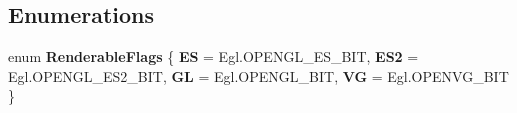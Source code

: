\subsection*{Enumerations}
\begin{DoxyCompactItemize}
\item 
enum {\bfseries Renderable\-Flags} \{ {\bfseries E\-S} = Egl.\-O\-P\-E\-N\-G\-L\-\_\-\-E\-S\-\_\-\-B\-I\-T, 
{\bfseries E\-S2} = Egl.\-O\-P\-E\-N\-G\-L\-\_\-\-E\-S2\-\_\-\-B\-I\-T, 
{\bfseries G\-L} = Egl.\-O\-P\-E\-N\-G\-L\-\_\-\-B\-I\-T, 
{\bfseries V\-G} = Egl.\-O\-P\-E\-N\-V\-G\-\_\-\-B\-I\-T
 \}
\end{DoxyCompactItemize}
